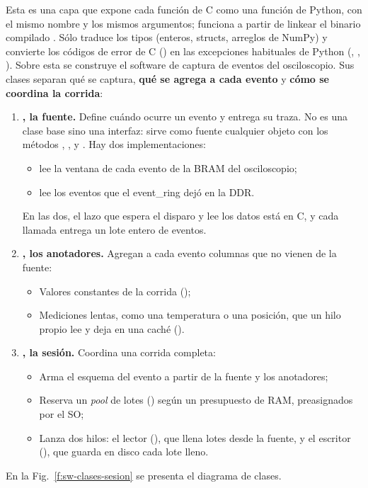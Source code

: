 Esta es una capa que expone cada función de C como una función de Python, con el
mismo nombre y los mismos argumentos; funciona a partir de linkear el binario
compilado . Sólo traduce los tipos (enteros, structs, arreglos
de NumPy) y convierte los códigos de error de C () en las
excepciones habituales de Python (, ,
). Sobre esta se construye el software de captura de eventos
del osciloscopio. Sus clases separan qué se captura, \textbf{qué se agrega a cada
evento} y \textbf{cómo se coordina la corrida}:
\begin{enumerate}
  \item \textbf{, la fuente.} Define cuándo ocurre un evento
    y entrega su traza. No es una clase base sino una interfaz: sirve como
    fuente cualquier objeto con los métodos ,
    ,  y . Hay dos
    implementaciones:
  \begin{itemize}
    \item {} lee la ventana de cada evento de la BRAM del
      osciloscopio;
    \item {} lee los eventos que el event\_ring dejó en la DDR.
  \end{itemize}
    En las dos, el lazo que espera el disparo y lee los datos está en C, y cada
    llamada entrega un lote entero de eventos.
  \item \textbf{, los anotadores.} Agregan a cada evento
    columnas que no vienen de la fuente:
  \begin{itemize}
    \item Valores constantes de la corrida ();
    \item Mediciones lentas, como una temperatura o una posición, que un hilo
      propio lee y deja en una caché ().
  \end{itemize}
  \item \textbf{, la sesión.} Coordina una corrida
    completa:
  \begin{itemize}
    \item Arma el esquema del evento a partir de la fuente y los anotadores;
    \item Reserva un \emph{pool} de lotes () según un presupuesto de
      RAM, preasignados por el SO;
    \item Lanza dos hilos: el lector (), que llena lotes
      desde la fuente, y el escritor (), que guarda en disco
      cada lote lleno.
  \end{itemize}
\end{enumerate}
En la Fig.~\ref{f:sw-clases-sesion} se presenta el diagrama de clases.

